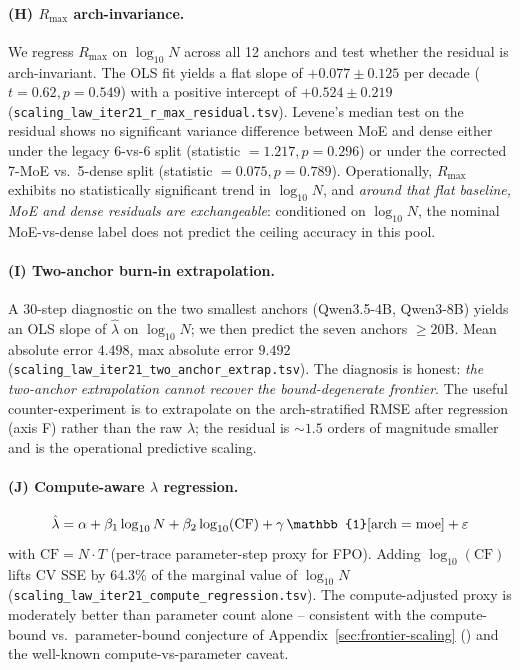 \paragraph{(H) $R_{\max}$ arch-invariance.}
\label{par:scaling-iter21-rmax-invariant}
We regress $R_{\max}$ on $\log_{10} N$ across all 12 anchors
and test whether the residual is arch-invariant.  The OLS fit yields
a flat slope of $+0.077 \pm 0.125$ per decade ($t = 0.62, p = 0.549$)
with a positive intercept of $+0.524 \pm 0.219$
(\texttt{scaling\_law\_iter21\_r\_max\_residual.tsv}).  Levene's
median test on the residual shows no significant variance difference
between MoE and dense either under the legacy 6-vs-6 split
(statistic $= 1.217, p = 0.296$) or under the corrected 7-MoE vs.\
5-dense split (statistic $= 0.075, p = 0.789$).  Operationally,
$R_{\max}$ exhibits no statistically significant trend in
$\log_{10} N$, and \emph{around that flat baseline, MoE and dense
residuals are exchangeable}: conditioned on $\log_{10} N$, the nominal
MoE-vs-dense label does not predict the ceiling accuracy in this pool.

\paragraph{(I) Two-anchor burn-in extrapolation.}
\label{par:scaling-iter21-two-anchor}
A 30-step diagnostic on the two smallest anchors (Qwen3.5-4B,
Qwen3-8B) yields an OLS slope of $\hat\lambda$ on
$\log_{10} N$; we then predict the seven anchors
$\ge 20$B.  Mean absolute error $4.498$, max absolute error
$9.492$ (\texttt{scaling\_law\_iter21\_two\_anchor\_extrap.tsv}).
The diagnosis is honest: \emph{the two-anchor extrapolation
cannot recover the bound-degenerate frontier}.  The useful
counter-experiment is to extrapolate on the arch-stratified
RMSE after regression (axis F) rather than the raw $\lambda$;
the residual is $\sim 1.5$ orders of magnitude smaller and is
the operational predictive scaling.

\paragraph{(J) Compute-aware $\lambda$ regression.}
\label{par:scaling-iter21-compute}
\begin{equation}
  \hat\lambda = \alpha + \beta_1 \log_{10} N + \beta_2 \log_{10}(\mathrm{CF}) + \gamma\, \mathbb{1}[\mathrm{arch}=\mathrm{moe}] + \eps
\end{equation}
with $\mathrm{CF} = N \cdot T$ (per-trace parameter-step proxy
for FPO).  Adding $\log_{10}(\mathrm{CF})$ lifts CV SSE by 64.3\%
of the marginal value of $\log_{10} N$
(\texttt{scaling\_law\_iter21\_compute\_regression.tsv}).
The compute-adjusted proxy is moderately better than parameter
count alone -- consistent with the compute-bound vs.\
parameter-bound conjecture of Appendix~\ref{sec:frontier-scaling}
(\secref{par:scaling-compute}) and the well-known
\citet{kaplan2020scalinglaws} compute-vs-parameter caveat.

